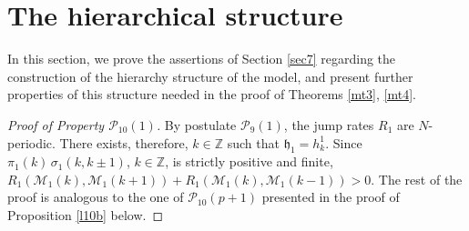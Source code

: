 \documentclass[reqno]{amsart}
\theoremstyle{plain}
\theoremstyle{definition}
\newcommand{\mc}[1]{{\mathcal #1}}
\newcommand{\mf}[1]{{\mathfrak #1}}
\newcommand{\bb}[1]{{\mathbb #1}}
\newcommand{\ms}[1]{{\mathscr #1}}
\newcounter{as}[section]
\newcommand{\<}{\langle}
\renewcommand{\>}{\rangle}
\begin{document}
\appendix

\section{The hierarchical structure}
\label{sec4}

In this section, we prove the assertions of Section \ref{sec7}
regarding the construction of the hierarchy structure of the model,
and present further properties of this structure needed in the proof
of Theorems \ref{mt3}, \ref{mt4}.

\begin{proof}[Proof of Property $\mc P_{10}(1)$]
By postulate $\mc P_9(1)$, the jump rates $R_1$ are $N$-periodic.
There exists, therefore, $k\in \bb Z$ such that $\mf h_1 = h^1_k$.
Since $\pi_1(k)\, \sigma_1(k,k\pm 1)$, $k\in \bb Z$, is strictly
positive and finite,
$R_1(\ms M_{1}(k),\ms M_{1}(k+1)) + R_1(\ms M_{1}(k),\ms M_{1}(k-1))
>0$. The rest of the proof is analogous to the one of
$\mc P_{10}(p+1)$ presented in the proof of Proposition \ref{l10b}
below.
\end{proof}
\end{document}
